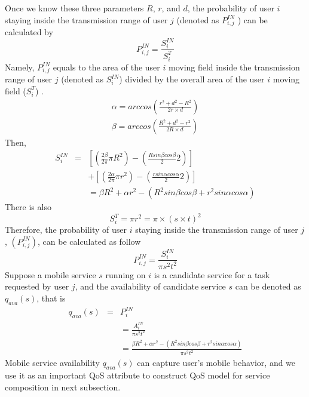 \documentclass[10pt,journal,compsoc]{IEEEtran}
\begin{document}
​Once we know these three parameters $R$, $r$, and $d$, the probability of user $i$ staying inside the transmission range of user $j$ (denoted as $P_{i,j}^{IN}$ ) can be calculated by
\begin{equation}
P_{i,j}^{IN} = \frac{S_i^{IN}}{S_i^T}
\end{equation}
Namely, $P^{IN}_{i,j}$ equals to the area of the user $i$ moving field inside the transmission range of user $j$ (denoted as $S^{IN}_i$) divided by the overall area of the user $i$ moving field ($S^T_i$) .
\begin{eqnarray}
\alpha = arccos(\frac{r^2+d^2-R^2}{2r\times d}) \\\nonumber
\beta = arccos(\frac{R^2+d^2-r^2}{2R\times d})
\end{eqnarray}
Then,
\setlength{\arraycolsep}{0.0em}
\begin{eqnarray}
S^{IN}_i&{}={} &[(\frac{2\beta}{2\pi}\pi R^2)-(\frac{R sin\beta cos\beta}{2}2)]\\\nonumber
&&+ [(\frac{2\alpha}{2\pi}\pi r^2)-(\frac{r sin\alpha cos\alpha}{2}2)]\\\nonumber
&&= \beta R^2 + \alpha r^2 - (R^2 sin\beta cos\beta + r^2 sin\alpha cos\alpha)
\end{eqnarray}
\setlength{\arraycolsep}{5pt}
There is also
\begin{equation}
S_i^T = \pi r^2 = \pi \times (s \times t)^2
\end{equation}
Therefore, the probability of user $i$ staying inside the transmission range of user $j$, $(P^{IN}_{i,j})$, can be calculated as follow
\begin{equation}
P_{i,j}^{IN} = \frac{S_i^{IN}}{\pi s^2 t^2}
\end{equation}
Suppose a mobile service $s$ running on $i$ is a candidate service for a task requested by user $j$, and the availability of candidate service $s$ can be denoted as $q_{ava}(s)$, that is
\begin{eqnarray}
q_{ava}(s) &{} = {}& P^{IN}_i \\\nonumber
&& = \frac{A_i^{IN}}{\pi s^2 t^2}\\\nonumber
&& = \frac{\beta R^2 + \alpha r^2 - (R^2 sin\beta cos\beta + r^2 sin\alpha cos\alpha)}{\pi s^2 t^2}
\end{eqnarray}
Mobile service availability $q_{ava}(s)$ can capture user's mobile behavior, and we use it as an important QoS attribute to construct QoS model for service composition in next subsection.
\end{document}
